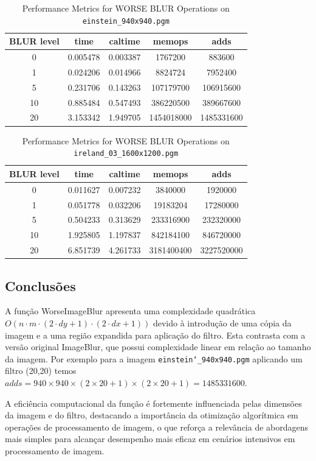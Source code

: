 \documentclass{report}
\begin{document}
\begin{table}[h]
    \centering
    \begin{tabular}{ccccc}
        \toprule
        \textbf{BLUR level} & \textbf{time} & \textbf{caltime} & \textbf{memops} & \textbf{adds} \\
        \midrule
        0 & 0.005478 & 0.003387 & 1767200 & 883600 \\
        1 & 0.024206 & 0.014966 & 8824724 & 7952400 \\
        5 & 0.231706 & 0.143263 & 107179700 & 106915600 \\
        10 & 0.885484 & 0.547493 & 386220500 & 389667600 \\
        20 & 3.153342 & 1.949705 & 1454018000 & 1485331600 \\
        \bottomrule
    \end{tabular}
    \caption*{Performance Metrics for WORSE BLUR Operations on \texttt{einstein\_940x940.pgm}}
\end{table}

\begin{table}[h]
    \centering
    \begin{tabular}{ccccc}
        \toprule
        \textbf{BLUR level} & \textbf{time} & \textbf{caltime} & \textbf{memops} & \textbf{adds} \\
        \midrule
        0 & 0.011627 & 0.007232 & 3840000 & 1920000 \\
        1 & 0.051778 & 0.032206 & 19183204 & 17280000 \\
        5 & 0.504233 & 0.313629 & 233316900 & 232320000 \\
        10 & 1.925805 & 1.197837 & 842184100 & 846720000 \\
        20 & 6.851739 & 4.261733 & 3181400400 & 3227520000 \\
        \bottomrule
    \end{tabular}
    \caption*{Performance Metrics for WORSE BLUR Operations on \texttt{ireland\_03\_1600x1200.pgm}}
\end{table}


\subsection{Conclusões}

A função WorseImageBlur apresenta uma complexidade quadrática \(O(n \cdot m \cdot (2 \cdot dy + 1) \cdot (2 \cdot dx + 1))\) devido à introdução de uma cópia da imagem e a uma região expandida para aplicação do filtro. Esta contrasta com a versão original ImageBlur, que possui complexidade linear em relação ao tamanho da imagem. Por exemplo para a imagem \texttt{einstein\char`_940x940.pgm} aplicando um filtro (20,20) temos \texttt{$adds = 940\times940\times(2\times20+1)\times(2\times20+1) = 1485331600$}.
\par A eficiência computacional da função é fortemente influenciada pelas dimensões da imagem e do filtro, destacando a importância da otimização algorítmica em operações de processamento de imagem, o que reforça a relevância de abordagens mais simples para alcançar desempenho mais eficaz em cenários intensivos em processamento de imagem.
\end{document}
